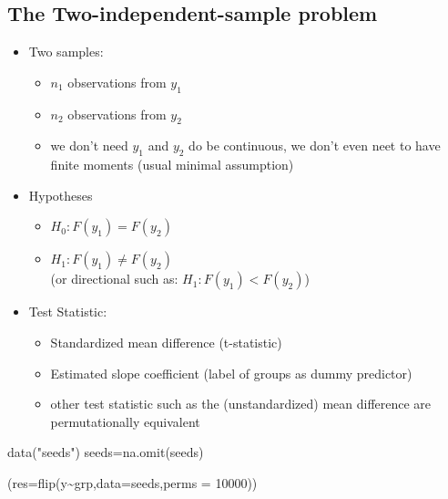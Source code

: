 \documentclass[
]{article}
\newenvironment{Shaded}{\begin{snugshade}}{\end{snugshade}}
\newcommand{\AttributeTok}[1]{\textcolor[rgb]{0.77,0.63,0.00}{#1}}
\newcommand{\DecValTok}[1]{\textcolor[rgb]{0.00,0.00,0.81}{#1}}
\newcommand{\FunctionTok}[1]{\textcolor[rgb]{0.00,0.00,0.00}{#1}}
\newcommand{\NormalTok}[1]{#1}
\newcommand{\OtherTok}[1]{\textcolor[rgb]{0.56,0.35,0.01}{#1}}
\newcommand{\SpecialCharTok}[1]{\textcolor[rgb]{0.00,0.00,0.00}{#1}}
\newcommand{\StringTok}[1]{\textcolor[rgb]{0.31,0.60,0.02}{#1}}
\providecommand{\tightlist}{%
  \setlength{\itemsep}{0pt}\setlength{\parskip}{0pt}}
\begin{document}
\hypertarget{the-two-independent-sample-problem}{%
\subsection{The Two-independent-sample
problem}\label{the-two-independent-sample-problem}}

\begin{itemize}
\tightlist
\item
  Two samples:

  \begin{itemize}
  \tightlist
  \item
    \(n_1\) observations from \(y_1\)
  \item
    \(n_2\) observations from \(y_2\)
  \item
    we don't need \(y_1\) and \(y_2\) do be continuous, we don't even
    neet to have finite moments (usual minimal assumption)
  \end{itemize}
\item
  Hypotheses

  \begin{itemize}
  \tightlist
  \item
    \(H_0: F(y_1)=F(y_2)\)\\
  \item
    \(H_1: F(y_1)\neq F(y_2)\)\\
    (or directional such as: \(H_1: F(y_1)<F(y_2)\))
  \end{itemize}
\end{itemize}

\begin{itemize}
\tightlist
\item
  Test Statistic:

  \begin{itemize}
  \tightlist
  \item
    Standardized mean difference (t-statistic)\\
  \item
    Estimated slope coefficient (label of groups as dummy predictor)\\
  \item
    other test statistic such as the (unstandardized) mean difference
    are permutationally equivalent
  \end{itemize}
\end{itemize}

\begin{Shaded}
\begin{Highlighting}[]
\FunctionTok{data}\NormalTok{(}\StringTok{"seeds"}\NormalTok{)}
\NormalTok{seeds}\OtherTok{=}\FunctionTok{na.omit}\NormalTok{(seeds)}

\NormalTok{(}\AttributeTok{res=}\FunctionTok{flip}\NormalTok{(y}\SpecialCharTok{\textasciitilde{}}\NormalTok{grp,}\AttributeTok{data=}\NormalTok{seeds,}\AttributeTok{perms =} \DecValTok{10000}\NormalTok{))}
\end{Highlighting}
\end{Shaded}
\end{document}
